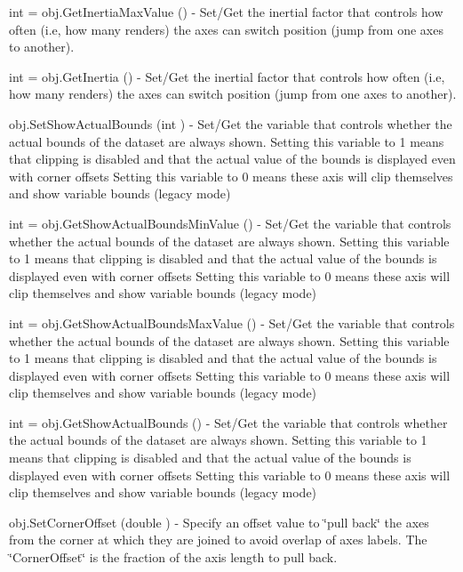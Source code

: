 \begin{DoxyItemize}
\item {\ttfamily int = obj.\-Get\-Inertia\-Max\-Value ()} -\/ Set/\-Get the inertial factor that controls how often (i.\-e, how many renders) the axes can switch position (jump from one axes to another).  
\item {\ttfamily int = obj.\-Get\-Inertia ()} -\/ Set/\-Get the inertial factor that controls how often (i.\-e, how many renders) the axes can switch position (jump from one axes to another).  
\item {\ttfamily obj.\-Set\-Show\-Actual\-Bounds (int )} -\/ Set/\-Get the variable that controls whether the actual bounds of the dataset are always shown. Setting this variable to 1 means that clipping is disabled and that the actual value of the bounds is displayed even with corner offsets Setting this variable to 0 means these axis will clip themselves and show variable bounds (legacy mode)  
\item {\ttfamily int = obj.\-Get\-Show\-Actual\-Bounds\-Min\-Value ()} -\/ Set/\-Get the variable that controls whether the actual bounds of the dataset are always shown. Setting this variable to 1 means that clipping is disabled and that the actual value of the bounds is displayed even with corner offsets Setting this variable to 0 means these axis will clip themselves and show variable bounds (legacy mode)  
\item {\ttfamily int = obj.\-Get\-Show\-Actual\-Bounds\-Max\-Value ()} -\/ Set/\-Get the variable that controls whether the actual bounds of the dataset are always shown. Setting this variable to 1 means that clipping is disabled and that the actual value of the bounds is displayed even with corner offsets Setting this variable to 0 means these axis will clip themselves and show variable bounds (legacy mode)  
\item {\ttfamily int = obj.\-Get\-Show\-Actual\-Bounds ()} -\/ Set/\-Get the variable that controls whether the actual bounds of the dataset are always shown. Setting this variable to 1 means that clipping is disabled and that the actual value of the bounds is displayed even with corner offsets Setting this variable to 0 means these axis will clip themselves and show variable bounds (legacy mode)  
\item {\ttfamily obj.\-Set\-Corner\-Offset (double )} -\/ Specify an offset value to \char`\"{}pull back\char`\"{} the axes from the corner at which they are joined to avoid overlap of axes labels. The \char`\"{}\-Corner\-Offset\char`\"{} is the fraction of the axis length to pull back.  

\end{DoxyItemize}
